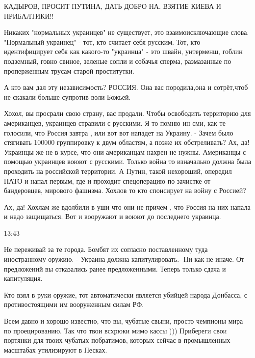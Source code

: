 КАДЫРОВ, ПРОСИТ ПУТИНА, ДАТЬ ДОБРО НА. ВЗЯТИЕ КИЕВА И ПРИБАЛТИКИ!!


Никаких "нормальных украинцев" не существует, это взаимоисключающие слова.
"Нормальный украинец" - тот, кто считает себя русским. Тот, кто идентифицирует
себя как какого-то "украинца" - это швайн, унтерменш, гоблин подземный, говно
свиное, зеленые сопли и собачья сперма, размазанные по проперженным трусам
старой проститутки.


А кто вам дал эту независимость? РОССИЯ. Она вас породила,она и сотрёт,чтоб не
скакали больше супротив воли Божьей.


Хохол, вы просрали свою страну, вас продали. Чтобы освободить территорию для
американцев, украинцев стравили с русскими. Я то помню ин сми, как те голосили,
что Россия завтра , или вот вот нападет на Украину.  - Зачем было стягивать
100000 группировку к двум областям, а позже их обстреливать?  Ах, да! Украинцы
же не в курсе, что они американцам нахрен не нужны. Американцы с помощью
украинцев воюют с русскими. Только война то изначально должна была проходить на
российской территории. А Путин, такой нехороший, опередил НАТО и напал первым,
где и проходит спецоперацию по зачистке от бандеровцев, мирового фашизма.
Хохлов то кто спонсирует на войну с Россией?

Ах, да! Хохлам же вдолбили в уши что они не причем , что Россия на них напала и
надо защищаться.  Вот и вооружают и воюют до последнего украинца.

13:43

Не переживай за те города. Бомбят их согласно поставленному туда иностранному
оружию. - Украина должна капитулировать.- Ни как не иначе. От предложений вы
отказались ранее предложенными. Теперь только сдача и капитуляция.

Кто взял в руки оружие, тот автоматически является убийцей народа Донбасса, с
противостоящими им вооруженным силам РФ.


Всем давно и хорошо известно, что вы, чубатые свыни, просто чемпионы мира по
проецированию. Так что твои всхрюки мимо кассы ))) Прибереги свои портянки для
твоих чубатых побратимов, которых сейчас в промышленных масштабах утилизируют в
Песках.

